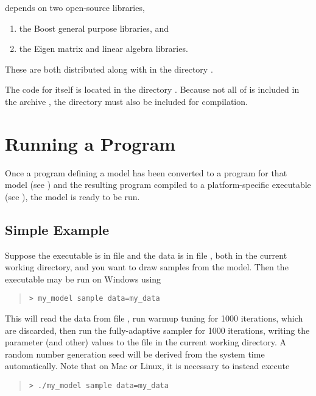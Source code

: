\Stan depends on two open-source libraries,
%
\begin{enumerate}
\item the Boost general purpose \Cpp libraries, and 
\item the Eigen matrix and linear algebra \Cpp libraries.
\end{enumerate}
%
These are both distributed along with \Stan in the directory
.  

The code for \Stan itself is located in the directory
.  Because not all of \Stan is included in the
archive , the  directory must also be
included for compilation.





\chapter{Running a \Stan Program}\label{stan-cmd.chapter}

\noindent 
Once a \Stan program defining a model has been converted to a \Cpp
program for that model (see ) and the resulting \Cpp
program compiled to a platform-specific executable (see
), the model is ready to be run.

\section{Simple Example}

Suppose the executable is in file  and the data
is in file , both in the current working directory, and
you want to draw samples from the model.
Then the \Stan executable may be run on Windows using
%
\begin{quote}
\begin{Verbatim}[fontshape=sl,fontsize=\small]
> my_model sample data=my_data
\end{Verbatim}
\end{quote}
%
This will read the data from file , run warmup tuning for
1000 iterations, which are discarded, then run the fully-adaptive
\NUTS sampler for 1000 iterations, writing the parameter (and other)
values to the file  in the current working
directory.  A random number generation seed will be derived from
the system time automatically. Note that on Mac or Linux, it is 
necessary to instead execute
%
\begin{quote}
\begin{Verbatim}[fontshape=sl,fontsize=\small]
> ./my_model sample data=my_data
\end{Verbatim}
\end{quote}
%
